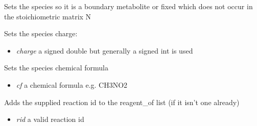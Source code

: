 \documentclass[a4paper,11pt,english]{sphinxmanual}
\begin{document}
\begin{fulllineitems}
\begin{fulllineitems}
\end{fulllineitems}


\begin{fulllineitems}
\label{modules_doc:cbmpy.CBModel.Species.setBoundary}
Sets the species so it is a boundary metabolite or fixed which does not occur in the stoichiometric matrix N

\end{fulllineitems}


\begin{fulllineitems}
\label{modules_doc:cbmpy.CBModel.Species.setCharge}
Sets the species charge:
\begin{itemize}
\item {} 
\emph{charge} a signed double but generally a signed int is used

\end{itemize}

\end{fulllineitems}


\begin{fulllineitems}
\label{modules_doc:cbmpy.CBModel.Species.setChemFormula}
Sets the species chemical formula
\begin{itemize}
\item {} 
\emph{cf} a chemical formula e.g. CH3NO2

\end{itemize}

\end{fulllineitems}


\begin{fulllineitems}
\label{modules_doc:cbmpy.CBModel.Species.setReagentOf}
Adds the supplied reaction id to the reagent\_of list (if it isn't one already)
\begin{itemize}
\item {} 
\emph{rid} a valid reaction id

\end{itemize}


\end{fulllineitems}
\end{fulllineitems}
\end{document}
